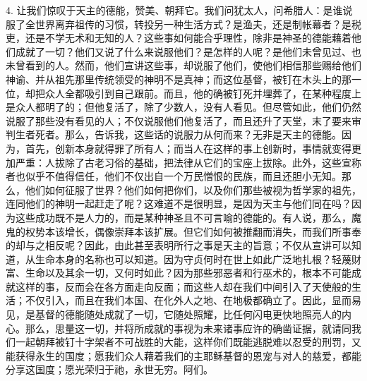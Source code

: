 4. 让我们惊叹于天主的德能，赞美、朝拜它。我们问犹太人，问希腊人：是谁说服了全世界离弃祖传的习惯，转投另一种生活方式？是渔夫，还是制帐幕者？是税吏，还是不学无术和无知的人？这些事如何能合乎理性，除非是神圣的德能藉着他们成就了一切？他们又说了什么来说服他们？是怎样的人呢？是他们未曾见过、也未曾看到的人。然而，他们宣讲这些事，却说服了他们，使他们相信那些赐给他们神谕、并从祖先那里传统领受的神明不是真神；而这位基督，被钉在木头上的那一位，却把众人全都吸引到自己跟前。而且，他的确被钉死并埋葬了，在某种程度上是众人都明了的；但他复活了，除了少数人，没有人看见。但尽管如此，他们仍然说服了那些没有看见的人；不仅说服他们他复活了，而且还升了天堂，末了要来审判生者死者。那么，告诉我，这些话的说服力从何而来？无非是天主的德能。因为，首先，创新本身就得罪了所有人；而当人在这样的事上创新时，事情就变得更加严重：人拔除了古老习俗的基础，把法律从它们的宝座上拔除。此外，这些宣称者也似乎不值得信任，他们不仅出自一个万民憎恨的民族，而且还胆小无知。那么，他们如何征服了世界？他们如何把你们，以及你们那些被视为哲学家的祖先，连同他们的神明一起赶走了呢？这难道不是很明显，是因为天主与他们同在吗？因为这些成功既不是人力的，而是某种神圣且不可言喻的德能的。有人说，那么，魔鬼的权势本该增长，偶像崇拜本该扩展。但它们如何被推翻而消失，而我们所事奉的却与之相反呢？因此，由此甚至表明所行之事是天主的旨意；不仅从宣讲可以知道，从生命本身的名称也可以知道。因为守贞何时在世上如此广泛地扎根？轻蔑财富、生命以及其余一切，又何时如此？因为那些邪恶者和行巫术的，根本不可能成就这样的事，反而会在各方面走向反面；而这些人却在我们中间引入了天使般的生活；不仅引入，而且在我们本国、在化外人之地、在地极都确立了。因此，显而易见，是基督的德能随处成就了一切，它随处照耀，比任何闪电更快地照亮人的内心。那么，思量这一切，并将所成就的事视为未来诸事应许的确凿证据，就请同我们一起朝拜被钉十字架者不可战胜的大能，这样你们既能逃脱难以忍受的刑罚，又能获得永生的国度；愿我们众人藉着我们的主耶稣基督的恩宠与对人的慈爱，都能分享这国度；愿光荣归于祂，永世无穷。阿们。\par



\section{}

